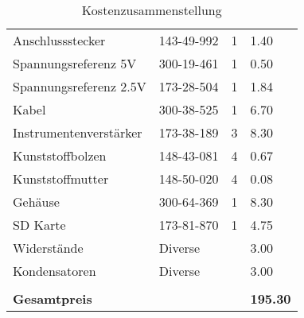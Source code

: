\begin{table}[h]
\begin{tabular}{llll}
Anschlussstecker       & 143-49-992       & 1              & 1.40            \\
Spannungsreferenz 5V   & 300-19-461       & 1              & 0.50            \\
Spannungsreferenz 2.5V & 173-28-504       & 1              & 1.84            \\
Kabel                  & 300-38-525       & 1              & 6.70            \\
Instrumentenverstärker & 173-38-189       & 3              & 8.30            \\
Kunststoffbolzen       & 148-43-081       & 4              & 0.67            \\
Kunststoffmutter       & 148-50-020       & 4              & 0.08            \\
Gehäuse                & 300-64-369       & 1              & 8.30            \\
SD Karte                          & 173-81-870          & 1              & 4.75               \\
Widerstände                       & Diverse          &                & 3.00            \\
Kondensatoren             & Diverse          &                & 3.00            \\
                       &                  &                &                 \\
\textbf{Gesamtpreis}   &                  &                & \textbf{195.30}
\end{tabular}
\caption{Kostenzusammenstellung}
\label{tab:kosten}
\end{table}
